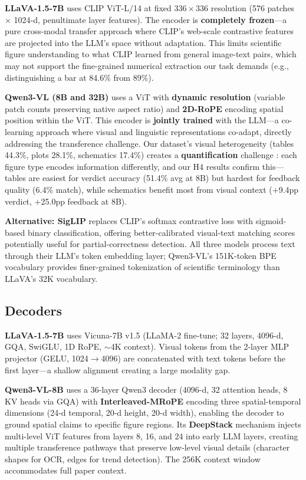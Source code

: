 \documentclass{article} %
\begin{document}
\textbf{LLaVA-1.5-7B} uses CLIP ViT-L/14 at fixed $336{\times}336$ resolution (576 patches $\times$ 1024-d, penultimate layer features). The encoder is \textbf{completely frozen}---a pure cross-modal transfer approach where CLIP's web-scale contrastive features are projected into the LLM's space without adaptation. This limits scientific figure understanding to what CLIP learned from general image-text pairs, which may not support the fine-grained numerical extraction our task demands (e.g., distinguishing a bar at 84.6\% from 89\%).

\textbf{Qwen3-VL (8B and 32B)} uses a ViT with \textbf{dynamic resolution} (variable patch counts preserving native aspect ratio) and \textbf{2D-RoPE} encoding spatial position within the ViT. This encoder is \textbf{jointly trained} with the LLM---a co-learning approach where visual and linguistic representations co-adapt, directly addressing the transference challenge. Our dataset's visual heterogeneity (tables 44.3\%, plots 28.1\%, schematics 17.4\%) creates a \textbf{quantification} challenge \citep{Liang-foundations-2024}: each figure type encodes information differently, and our H4 results confirm this---tables are easiest for verdict accuracy (51.4\% avg at 8B) but hardest for feedback quality (6.4\% match), while schematics benefit most from visual context (+9.4pp verdict, +25.0pp feedback at 8B).

\textbf{Alternative: SigLIP} replaces CLIP's softmax contrastive loss with sigmoid-based binary classification, offering better-calibrated visual-text matching scores potentially useful for partial-correctness detection. All three models process text through their LLM's token embedding layer; Qwen3-VL's 151K-token BPE vocabulary provides finer-grained tokenization of scientific terminology than LLaVA's 32K vocabulary.

\subsection{ Decoders}

\textbf{LLaVA-1.5-7B} uses Vicuna-7B v1.5 (LLaMA-2 fine-tune; 32 layers, 4096-d, GQA, SwiGLU, 1D RoPE, ${\sim}$4K context). Visual tokens from the 2-layer MLP projector (GELU, 1024$\rightarrow$4096) are concatenated with text tokens before the first layer---a shallow alignment creating a large modality gap.

\textbf{Qwen3-VL-8B} uses a 36-layer Qwen3 decoder (4096-d, 32 attention heads, 8 KV heads via GQA) with \textbf{Interleaved-MRoPE} encoding three spatial-temporal dimensions (24-d temporal, 20-d height, 20-d width), enabling the decoder to ground spatial claims to specific figure regions. Its \textbf{DeepStack} mechanism \citep{ge2024deepstack} injects multi-level ViT features from layers 8, 16, and 24 into early LLM layers, creating multiple transference pathways that preserve low-level visual details (character shapes for OCR, edges for trend detection). The 256K context window accommodates full paper context.
\end{document}
